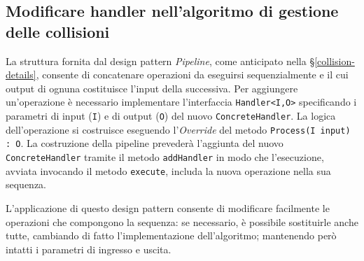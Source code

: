 \subsection{Modificare handler nell'algoritmo di gestione delle collisioni}

La struttura fornita dal design pattern \textit{Pipeline}, come anticipato nella \S \ref{collision-details}, consente di concatenare operazioni da eseguirsi sequenzialmente e il cui output di ognuna costituisce l'input della successiva. Per aggiungere un'operazione è necessario implementare l'interfaccia \texttt{Handler<I,O>} specificando i parametri di input (\texttt{I}) e di output (\texttt{O}) del nuovo \texttt{ConcreteHandler}. La logica dell'operazione si costruisce eseguendo l'\textit{Override} del metodo \texttt{Process(I input) : O}. La costruzione della pipeline prevederà l'aggiunta del nuovo \texttt{ConcreteHandler} tramite il metodo \texttt{addHandler} in modo che l'esecuzione, avviata invocando il metodo \texttt{execute}, includa la nuova operazione nella sua sequenza.

L'applicazione di questo design pattern consente di modificare facilmente le operazioni che compongono la sequenza: se necessario, è possibile sostituirle anche tutte, cambiando di fatto l'implementazione dell'algoritmo; mantenendo però intatti i parametri di ingresso e uscita.